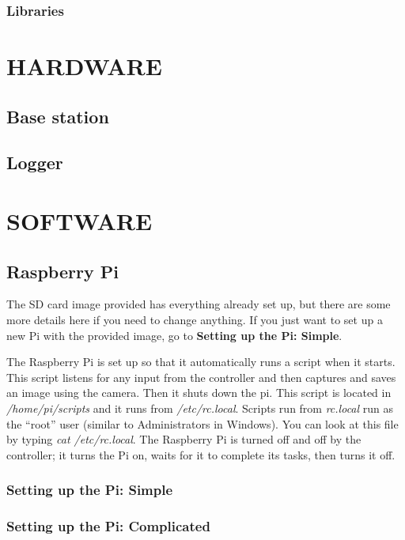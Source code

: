 \documentclass[10pt]{article}
\begin{document}
\subsubsection{Libraries}

\section{HARDWARE}

\subsection{Base station}

\subsection{Logger}

\section{SOFTWARE}

\subsection{Raspberry Pi}
The SD card image provided has everything already set up, but there are some more details here if you need to change anything. If you just want to set up a new Pi with the
provided image, go to \textbf{Setting up the Pi: Simple}. \break

The Raspberry Pi is set up so that it automatically runs a script when it starts. This script listens for any input from the controller and then captures and saves an image
using the camera. Then it shuts down the pi. This script is located in \textit{/home/pi/scripts} and it runs from \textit{/etc/rc.local}. Scripts run from \textit{rc.local}
run as the ``root'' user (similar to Administrators in Windows). You can look at this file by typing \textit{cat /etc/rc.local}. The Raspberry Pi is turned off and off
by the controller; it turns the Pi on, waits for it to complete its tasks, then turns it off.

\subsubsection{Setting up the Pi: Simple}

\subsubsection{Setting up the Pi: Complicated}
\end{document}
